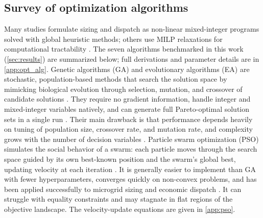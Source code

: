 \documentclass[final,3p,times]{elsarticle}
\begin{document}
\subsection{Survey of optimization algorithms}

Many studies formulate sizing and dispatch as non-linear mixed-integer programs solved with global heuristic methods; others use MILP relaxations for computational tractability \cite{parisio2014, Qu2018}. The seven algorithms benchmarked in this work (\cref{sec:results}) are summarized below; full derivations and parameter details are in \cref{app:opt_alg}. Genetic algorithms (GA) and evolutionary algorithms (EA) are stochastic, population-based methods that search the solution space by mimicking biological evolution through selection, mutation, and crossover of candidate solutions \cite{nemati2015}. They require no gradient information, handle integer and mixed-integer variables natively, and can generate full Pareto-optimal solution sets in a single run \cite{fadaee2012}. Their main drawback is that performance depends heavily on tuning of population size, crossover rate, and mutation rate, and complexity grows with the number of decision variables \cite{fathima2015}. Particle swarm optimization (PSO) simulates the social behavior of a swarm: each particle moves through the search space guided by its own best-known position and the swarm's global best, updating velocity at each iteration \cite{fathima2015, pathak2017}. It is generally easier to implement than GA with fewer hyperparameters, converges quickly on non-convex problems, and has been applied successfully to microgrid sizing and economic dispatch \cite{alrashidi2010}. It can struggle with equality constraints and may stagnate in flat regions of the objective landscape. The velocity-update equations are given in \cref{app:pso}.
\end{document}
